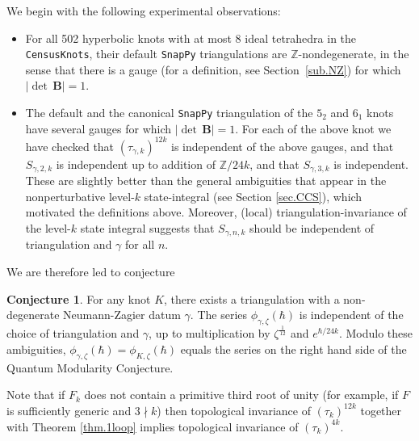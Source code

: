 \documentclass[12pt]{amsart}
\theoremstyle{definition}
\newtheorem{conjecture}[theorem]{Conjecture}
\def\BZ{\mathbb Z}
\newcommand{\mb}{\mathbf}
\begin{document}
We begin with the following experimental observations:
\begin{itemize}
\item 
For all 502 hyperbolic knots with at most 8 ideal tetrahedra in the 
{\tt CensusKnots}, their default {\tt SnapPy} triangulations are 
$\BZ$-nondegenerate, in the sense that there is a gauge 
(for a definition, see Section~\ref{sub.NZ}) for which $|\!\det\, \mb B|=1$.
\item 
The default and the canonical {\tt SnapPy} triangulation of the $5_2$
and $6_1$ knots have several gauges for which $|\!\det\, \mb B|=1$.
For each of the above knot we have checked that $(\tau_{\gamma,k})^{12k}$
is independent of the above gauges, and that $S_{\gamma,2,k}$ 
is independent up to addition of $\BZ/{24k}$, and that $S_{\gamma,3,k}$ is  
independent. These are slightly better than the general ambiguities that 
appear in the nonperturbative level-$k$ state-integral (see Section 
\ref{sec.CCS}), which motivated the definitions above. Moreover, 
(local) triangulation-invariance of the  
level-$k$ state integral suggests that $S_{\gamma,n,k}$ should be independent 
of triangulation and $\gamma$ for all $n$. 
\end{itemize}
%
We are therefore led to conjecture
%
\begin{conjecture}
\label{conj.inv}
For any knot $K$, there exists a triangulation with a non-degenerate 
Neumann-Zagier datum $\gamma$. The series $\phi_{\gamma,\zeta}(\hbar)$ is 
independent of the choice of triangulation and $\gamma$, up to multiplication 
by $\zeta^{\frac1{12}}$ and $e^{\hbar/24k}$. Modulo these ambiguities, 
$\phi_{\gamma,\zeta}(\hbar)=\phi_{K,\zeta}(\hbar)$ equals the series on the 
right hand side of the Quantum Modularity Conjecture.
\end{conjecture}

Note that if $F_k$ does not contain a primitive third root of unity (for 
example, if $F$ is sufficiently generic and $3\nmid k$) then topological 
invariance of $(\tau_{k})^{12 k}$ together with Theorem \ref{thm.1loop} 
implies topological invariance of $(\tau_k)^{4k}$.
\end{document}
